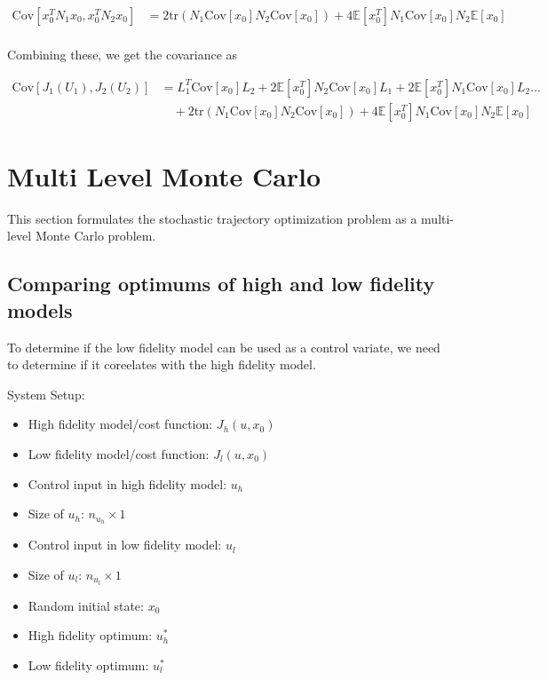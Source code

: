 \documentclass{article}
\begin{document}
\begin{equation}
  \begin{aligned}
    \text{Cov}[x_0^T N_1 x_0, x_0^T N_2 x_0] &= 2 \text{tr}(N_1 \text{Cov}[x_0] N_2 \text{Cov}[x_0]) + 4 \mathbb{E}[x_0^T]N_1\text{Cov}[x_0]N_2\mathbb{E}[x_0] \\
  \end{aligned}
\end{equation}

Combining these, we get the covariance as

\begin{equation}
  \begin{aligned}
    \text{Cov}[J_1(U_1), J_2(U_2)] &= L_1^T \text{Cov}[x_0] L_2 + 2 \mathbb{E}[x_0^T] N_2 \text{Cov}[x_0] L_1 + 2 \mathbb{E}[x_0^T] N_1 \text{Cov}[x_0] L_2 \hdots \\
    & \quad + 2 \text{tr}(N_1 \text{Cov}[x_0] N_2 \text{Cov}[x_0]) + 4 \mathbb{E}[x_0^T]N_1\text{Cov}[x_0]N_2\mathbb{E}[x_0]
  \end{aligned}
\end{equation}

\section{Multi Level Monte Carlo}

This section formulates the stochastic trajectory optimization problem as a multi-level Monte Carlo problem.

\subsection{Comparing optimums of high and low fidelity models} \label{comp_opt}

To determine if the low fidelity model can be used as a control variate, we need to determine if it coreelates with the high fidelity model.

System Setup:
\begin{itemize}
  \item High fidelity model/cost function: $J_h(u, x_0)$
  \item Low fidelity model/cost function: $J_l(u, x_0)$
  \item Control input in high fidelity model: $u_h$
  \item Size of $u_h$: $n_{u_h} \times 1$
  \item Control input in low fidelity model: $u_l$
  \item Size of $u_l$: $n_{u_l} \times 1$
  \item Random initial state: $x_0$
  \item High fidelity optimum: $u_h^*$
  \item Low fidelity optimum: $u_l^*$
\end{itemize}
\end{document}
